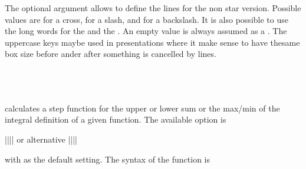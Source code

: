 \documentclass[11pt,english,BCOR=10mm,DIV=12,bibliography=totoc,parskip=false,headings=small,
    headinclude=false,footinclude=false,oneside]{pst-doc}
\begin{document}
The optional argument  allows to define the lines for the non star version.
Possible values are  for a cross,  for a slash, and 
for a backslash. It is also possible to use the long words for the  and the .
An empty value is always assumed as a . The uppercase keys maybe used in presentations where it make sense 
to have thesame box size before ander after something is cancelled by lines.

\begin{LTXexample}[pos=t,wide]
   \quad
{}\quad
{}\quad
{}\\
\quad
{}\quad
{}
\end{LTXexample}

\clearpage
\section{}
 calculates a step function for the upper or lower
sum or the max/min of the  integral definition of a given
function. The available option is

|||| or alternative
||||

with  as the default setting. The syntax of the function is

\begin{BDef}
\OptArgs{}
\end{BDef}
\end{document}
